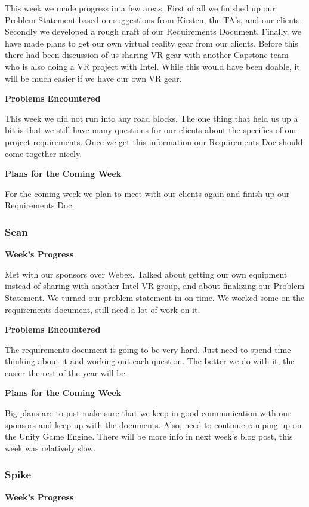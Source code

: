 \documentclass[10pt,journal,compsoc,onecolumn, draftclsnofoot]{IEEEtran}
\begin{document}
This week we made progress in a few areas. First of all we finished up our Problem Statement based on suggestions from Kirsten, the TA's, and our clients. Secondly we developed a rough draft of our Requirements Document. Finally, we have made plans to get our own virtual reality gear from our clients. Before this there had been discussion of us sharing VR gear with another Capstone team who is also doing a VR project with Intel. While this would have been doable, it will be much easier if we have our own VR gear.

\noindent \textbf{Problems Encountered}

This week we did not run into any road blocks. The one thing that held us up a bit is that we still have many questions for our clients about the specifics of our project requirements. Once we get this information our Requirements Doc should come together nicely.

\noindent \textbf{Plans for the Coming Week}

For the coming week we plan to meet with our clients again and finish up our Requirements Doc.

\subsubsection{Sean}
\noindent \textbf{Week's Progress}

Met with our sponsors over Webex.  Talked about getting our own equipment instead of sharing with another Intel VR group, and about finalizing our Problem Statement.  We turned our problem statement in on time.  We worked some on the requirements document, still need a lot of work on it.

\noindent \textbf{Problems Encountered}

The requirements document is going to be very hard.  Just need to spend time thinking about it and working out each question.  The better we do with it, the easier the rest of the year will be.

\noindent \textbf{Plans for the Coming Week}

Big plans are to just make sure that we keep in good communication with our sponsors and keep up with the documents.  Also, need to continue ramping up on the Unity Game Engine.  There will be more info in next week's blog post, this week was relatively slow.

\subsubsection{Spike}
\noindent \textbf{Week's Progress}
\end{document}
